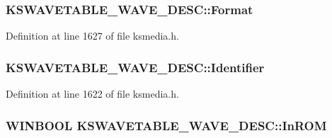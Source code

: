 \subsubsection[{\texorpdfstring{Format}{Format}}]{ K\+S\+W\+A\+V\+E\+T\+A\+B\+L\+E\+\_\+\+W\+A\+V\+E\+\_\+\+D\+E\+S\+C\+::\+Format}\hypertarget{struct_k_s_w_a_v_e_t_a_b_l_e___w_a_v_e___d_e_s_c_ab2f957fe18434770d72c79f554112745}{}\label{struct_k_s_w_a_v_e_t_a_b_l_e___w_a_v_e___d_e_s_c_ab2f957fe18434770d72c79f554112745}


Definition at line 1627 of file ksmedia.\+h.

\subsubsection[{\texorpdfstring{Identifier}{Identifier}}]{ K\+S\+W\+A\+V\+E\+T\+A\+B\+L\+E\+\_\+\+W\+A\+V\+E\+\_\+\+D\+E\+S\+C\+::\+Identifier}\hypertarget{struct_k_s_w_a_v_e_t_a_b_l_e___w_a_v_e___d_e_s_c_aedcb13d2d8ae05b022283d15183c150c}{}\label{struct_k_s_w_a_v_e_t_a_b_l_e___w_a_v_e___d_e_s_c_aedcb13d2d8ae05b022283d15183c150c}


Definition at line 1622 of file ksmedia.\+h.

\subsubsection[{\texorpdfstring{In\+R\+OM}{InROM}}]{\setlength{\rightskip}{0pt plus 5cm}W\+I\+N\+B\+O\+OL K\+S\+W\+A\+V\+E\+T\+A\+B\+L\+E\+\_\+\+W\+A\+V\+E\+\_\+\+D\+E\+S\+C\+::\+In\+R\+OM}\hypertarget{struct_k_s_w_a_v_e_t_a_b_l_e___w_a_v_e___d_e_s_c_a3ed3e62356393ecb290252d498c0a9e5}{}\label{struct_k_s_w_a_v_e_t_a_b_l_e___w_a_v_e___d_e_s_c_a3ed3e62356393ecb290252d498c0a9e5}


